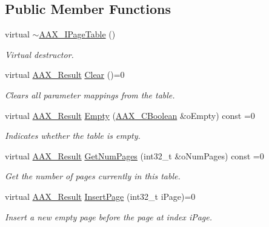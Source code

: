 \subsection*{Public Member Functions}
\begin{DoxyCompactItemize}
\item 
virtual \mbox{\hyperlink{a01849_a5613c827997f9671abef60a591607ee8}{$\sim$\+A\+A\+X\+\_\+\+I\+Page\+Table}} ()
\begin{DoxyCompactList}\small\item\em Virtual destructor. \end{DoxyCompactList}\item 
virtual \mbox{\hyperlink{a00392_a4d8f69a697df7f70c3a8e9b8ee130d2f}{A\+A\+X\+\_\+\+Result}} \mbox{\hyperlink{a01849_a00a902ce17c43ae32947dba6088936d2}{Clear}} ()=0
\begin{DoxyCompactList}\small\item\em Clears all parameter mappings from the table. \end{DoxyCompactList}\item 
virtual \mbox{\hyperlink{a00392_a4d8f69a697df7f70c3a8e9b8ee130d2f}{A\+A\+X\+\_\+\+Result}} \mbox{\hyperlink{a01849_a6953bc99853c741500f5619b8e675c30}{Empty}} (\mbox{\hyperlink{a00392_aa216506530f1d19a2965931ced2b274b}{A\+A\+X\+\_\+\+C\+Boolean}} \&o\+Empty) const =0
\begin{DoxyCompactList}\small\item\em Indicates whether the table is empty. \end{DoxyCompactList}\item 
virtual \mbox{\hyperlink{a00392_a4d8f69a697df7f70c3a8e9b8ee130d2f}{A\+A\+X\+\_\+\+Result}} \mbox{\hyperlink{a01849_a663a8c380ff8f8234fcabb8e8619ac7d}{Get\+Num\+Pages}} (int32\+\_\+t \&o\+Num\+Pages) const =0
\begin{DoxyCompactList}\small\item\em Get the number of pages currently in this table. \end{DoxyCompactList}\item 
virtual \mbox{\hyperlink{a00392_a4d8f69a697df7f70c3a8e9b8ee130d2f}{A\+A\+X\+\_\+\+Result}} \mbox{\hyperlink{a01849_a95b7b4d99253e26dd46d2deb4cf96bf8}{Insert\+Page}} (int32\+\_\+t i\+Page)=0
\begin{DoxyCompactList}\small\item\em Insert a new empty page before the page at index {\ttfamily i\+Page}. \end{DoxyCompactList}\item 

\end{DoxyCompactItemize}
